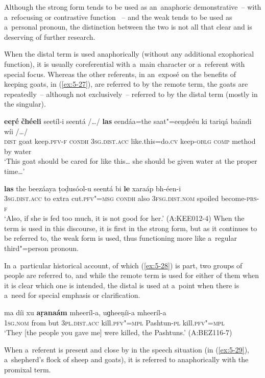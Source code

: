 Although the strong form tends to be used as an~anaphoric demonstrative~-- with a~refocusing or contrastive function \citep[432]{diessel2006}~-- and the weak tends to be used as a~personal pronoun, the distinction between the two is not all that clear and is deserving of further research.

When the distal term is used anaphorically (without any additional exophorical function), it is usually coreferential with a~main character or a~referent with special focus. Whereas the other referents, in an~exposé on the benefits of keeping goats, in (\ref{ex:5-27}), are referred to by the remote term, the goats are repeatedly~-- although not exclusively~-- referred to by the distal term (mostly in the singular). 

\ea
\label{ex:5-27}
\gll \textbf{eeṛé} \textbf{čhéeli} seetíl-i seentá /{\ldots}/ \textbf{las} eendáa=the saat"=eeṇḍeéu ki tariqá baándi wíi /{\ldots}/ \\
\textsc{dist} goat keep.\textsc{pfv-f} \textsc{condh} {} \textsc{3sg.dist.acc} like.this=do.\textsc{cv} keep-\textsc{oblg} \textsc{comp} method by water\\
\glt `This goat should be cared for like this{\ldots} she should be given water at the proper time{\ldots}'

\gll \textbf{las} the beezáaya ṭoḍusóol-u seentá bi \textbf{le} xaraáp bh-éen-i \\
\textsc{3sg}.\textsc{dist.acc} to extra cut.\textsc{pfv"=msg} \textsc{condh} also
\textsc{3fsg}.\textsc{dist.nom} spoiled become-\textsc{prs-f} \\
\glt `Also, if she is fed too much, it is not good for her.' (A:KEE012-4)
\z
{}
When the term is used in this discourse, it is first in the strong form, but as it continues to be referred to, the weak form is used, thus functioning more like a~regular third"=person pronoun.

In a~particular historical account, of which (\ref{ex:5-28}) is part, two groups of people are referred to, and while the remote term is used for either of them when it is clear which one is intended, the distal is used at a~point when there is a~need for special emphasis or clarification.

\begin{exe}
\ex
\label{ex:5-28}
\gll ma díi xu \textbf{aṛanaám} mheeríl-a, uɡheeṇíi-a mheeríl-a\\
\textsc{1sg}.\textsc{nom} from but \textsc{3pl.}\textsc{dist.acc} kill.\textsc{pfv"=mpl} Pashtun-\textsc{pl} kill.\textsc{pfv"=mpl}\\
\glt `They [the people you gave me] were killed, the Pashtuns.' (A:BEZ116-7)\\
\end{exe}
When a~referent is present and close by in the speech situation (in (\ref{ex:5-29}), a~shepherd's flock of sheep and goats), it is referred to anaphorically with the promixal term.


